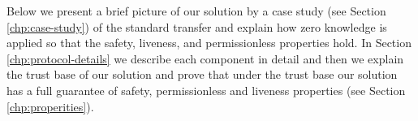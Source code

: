 \documentclass[pageno]{jpaper}
\begin{document}
\smallskip Below we present a brief picture of our solution by a case study (see Section \ref{chp:case-study}) of the standard transfer and explain how zero knowledge is applied so that the safety, liveness, and permissionless properties hold. In Section \ref{chp:protocol-details} we describe each component in detail and then we explain the trust base of our solution and prove that under the trust base our solution has a full guarantee of safety, permissionless and liveness properties (see Section \ref{chp:properities}).










\end{document}
